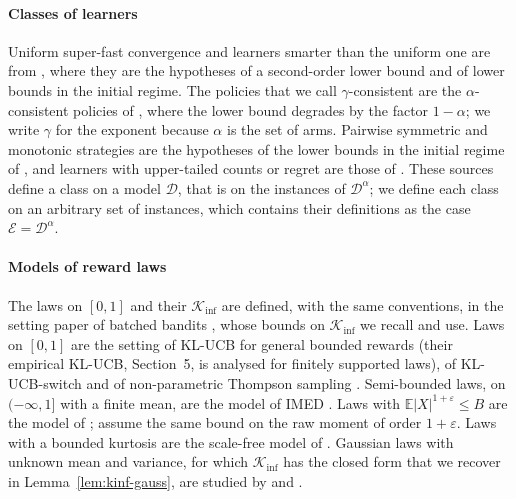 \documentclass[11pt]{article}
\newcommand{\E}{\mathbb{E}}
\begin{document}
\paragraph{Classes of learners} Uniform super-fast convergence and learners smarter than the
uniform one are from \citet[Definitions~6 and~2]{GMS19}, where they are the hypotheses of a
second-order lower bound and of lower bounds in the initial regime. The policies that we call
$\gamma$-consistent are the $\alpha$-consistent policies of \citet[Definition~5]{SAE13}, where the
lower bound degrades by the factor $1-\alpha$; we write $\gamma$ for the exponent because $\alpha$
is the set of arms. Pairwise symmetric and monotonic strategies are the hypotheses of the lower
bounds in the initial regime of \citet[Definitions~3 and~4, Theorems~3 and~4]{GMS19}, and learners with
upper-tailed counts or regret are those of \citet[Definition~1]{SA11}. These sources define a class on
a model $\mathcal D$, that is on the instances of
$\mathcal D^\alpha$; we define each class on an arbitrary set of instances, which contains their
definitions as the case $\mathcal E=\mathcal D^\alpha$.

\paragraph{Models of reward laws} The laws on $[0,1]$ and their $\mathcal K_{\inf}$ are defined, with
the same conventions, in the setting paper of batched bandits \citep[Definitions~3.1--3.2]{INC-P006},
whose bounds on $\mathcal K_{\inf}$ \citep[Proposition~4.2]{INC-P006} we recall and use. Laws on
$[0,1]$ are the setting of KL-UCB for general bounded
rewards \citep[Section~6]{CGMMS13} (their empirical KL-UCB, Section~5, is analysed for finitely
supported laws), of KL-UCB-switch \citep[Section~2]{GHMS22} and of non-parametric
Thompson sampling \citep[Theorem~5]{RH20}. Semi-bounded laws, on $(-\infty,1]$ with a finite mean,
are the model of IMED \citep[Section~1]{HT15}. Laws with $\E|X|^{1+\varepsilon}\le B$ are the model
of \citet[Section~2]{AJK21}; \citet[Theorem~1]{BCL13} assume the same bound on the raw moment of
order $1+\varepsilon$.
Laws with a bounded kurtosis are the scale-free model of \citet[Assumption~1]{L17}. Gaussian laws
with unknown mean and variance, for which $\mathcal K_{\inf}$ has the closed form that we recover in
Lemma~\ref{lem:kinf-gauss}, are studied by \citet[Section~2]{HT14} and \citet[Section~1]{CHK18}.
\end{document}
